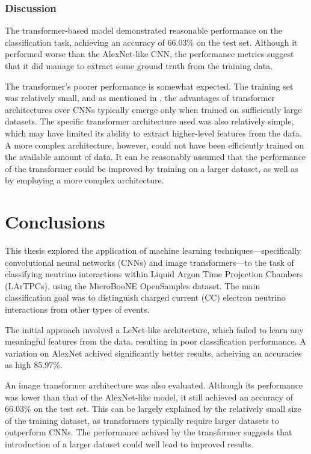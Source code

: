 \documentclass{pracalicmgr}
\begin{document}
\subsection{Discussion}

The transformer-based model demonstrated reasonable performance on the classification task, achieving an accuracy of 66.03\% on the test set. Although it performed worse than the AlexNet-like CNN, the performance metrics suggest that it did manage to extract some ground truth from the training data.

The transformer's poorer performance is somewhat expected. The training set was relatively small, and as mentioned in \cite{ViT}, the advantages of transformer architectures over CNNs typically emerge only when trained on sufficiently large datasets. The specific transformer architecture used was also relatively simple, which may have limited its ability to extract higher-level features from the data. A more complex architecture, however, could not have been efficiently trained on the available amount of data. It can be reasonably assumed that the performance of the transformer could be improved by training on a larger dataset, as well as by employing a more complex architecture.

\chapter{Conclusions}

This thesis explored the application of machine learning techniques—specifically convolutional neural networks (CNNs) and image transformers—to the task of classifying neutrino interactions within Liquid Argon Time Projection Chambers (LArTPCs), using the MicroBooNE OpenSamples dataset. The main classification goal was to distinguish charged current (CC) electron neutrino interactions from other types of events.

The initial approach involved a LeNet-like architecture, which failed to learn any meaningful features from the data, resulting in poor classification performance.
A variation on AlexNet achived significantly better results, acheiving an accuracies as high 85.97\%.

An image transformer architecture was also evaluated. Although its performance was lower than that of the AlexNet-like model, it still achieved an accuracy of 66.03\% on the test set. This can be largely explained by the relatively small size of the training dataset, as transformers typically require larger datasets to outperform CNNs. The performance achived by the transformer suggests that introduction of a larger dataset could well lead to improved results.
\end{document}
